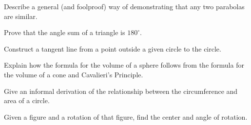 \begin{prob}
Describe a general (and foolproof) way of demonstrating that any two parabolas are similar.
\end{prob}

\begin{prob}
Prove that the angle sum of a triangle is $180^\circ$.
\end{prob}

\begin{prob}
Construct a tangent line from a point outside a given circle to the circle.
\end{prob}

\begin{prob}
Explain how the formula for the volume of a sphere follows from the formula for the volume of a cone and Cavalieri's Principle.
\end{prob}

\begin{prob}
Give an informal derivation of the relationship between the circumference and area of a circle. 
\end{prob}

\begin{prob}
Given a figure and a rotation of that figure, find the center and angle of rotation.  
\end{prob}

